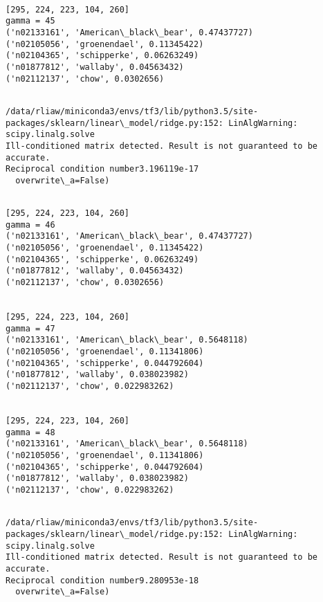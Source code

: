 \documentclass[11pt]{article}
\begin{document}
    \begin{Verbatim}[commandchars=\\\{\}]

[295, 224, 223, 104, 260]
gamma = 45
('n02133161', 'American\_black\_bear', 0.47437727)
('n02105056', 'groenendael', 0.11345422)
('n02104365', 'schipperke', 0.06263249)
('n01877812', 'wallaby', 0.04563432)
('n02112137', 'chow', 0.0302656)


    \end{Verbatim}

    \begin{Verbatim}[commandchars=\\\{\}]
/data/rliaw/miniconda3/envs/tf3/lib/python3.5/site-packages/sklearn/linear\_model/ridge.py:152: LinAlgWarning: scipy.linalg.solve
Ill-conditioned matrix detected. Result is not guaranteed to be accurate.
Reciprocal condition number3.196119e-17
  overwrite\_a=False)

    \end{Verbatim}

    \begin{Verbatim}[commandchars=\\\{\}]

[295, 224, 223, 104, 260]
gamma = 46
('n02133161', 'American\_black\_bear', 0.47437727)
('n02105056', 'groenendael', 0.11345422)
('n02104365', 'schipperke', 0.06263249)
('n01877812', 'wallaby', 0.04563432)
('n02112137', 'chow', 0.0302656)


[295, 224, 223, 104, 260]
gamma = 47
('n02133161', 'American\_black\_bear', 0.5648118)
('n02105056', 'groenendael', 0.11341806)
('n02104365', 'schipperke', 0.044792604)
('n01877812', 'wallaby', 0.038023982)
('n02112137', 'chow', 0.022983262)


[295, 224, 223, 104, 260]
gamma = 48
('n02133161', 'American\_black\_bear', 0.5648118)
('n02105056', 'groenendael', 0.11341806)
('n02104365', 'schipperke', 0.044792604)
('n01877812', 'wallaby', 0.038023982)
('n02112137', 'chow', 0.022983262)


    \end{Verbatim}

    \begin{Verbatim}[commandchars=\\\{\}]
/data/rliaw/miniconda3/envs/tf3/lib/python3.5/site-packages/sklearn/linear\_model/ridge.py:152: LinAlgWarning: scipy.linalg.solve
Ill-conditioned matrix detected. Result is not guaranteed to be accurate.
Reciprocal condition number9.280953e-18
  overwrite\_a=False)

    \end{Verbatim}
\end{document}
